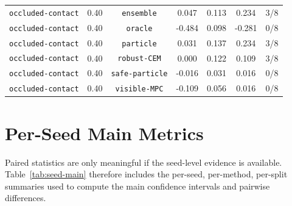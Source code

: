 \documentclass{article}
\begin{document}
\begin{center}
\begin{tabular}{llccccc}
\texttt{occluded-contact} & 0.40 & \texttt{ensemble} & 0.047 & 0.113 & 0.234 & 3/8 \\
\texttt{occluded-contact} & 0.40 & \texttt{oracle} & -0.484 & 0.098 & -0.281 & 0/8 \\
\texttt{occluded-contact} & 0.40 & \texttt{particle} & 0.031 & 0.137 & 0.234 & 3/8 \\
\texttt{occluded-contact} & 0.40 & \texttt{robust-CEM} & 0.000 & 0.122 & 0.109 & 3/8 \\
\texttt{occluded-contact} & 0.40 & \texttt{safe-particle} & -0.016 & 0.031 & 0.016 & 0/8 \\
\texttt{occluded-contact} & 0.40 & \texttt{visible-MPC} & -0.109 & 0.056 & 0.016 & 0/8 \\
\bottomrule
\end{tabular}
\end{center}
\normalsize

\section{Per-Seed Main Metrics}
Paired statistics are only meaningful if the seed-level evidence is available. Table~\ref{tab:seed-main} therefore includes the per-seed, per-method, per-split summaries used to compute the main confidence intervals and pairwise differences.
\end{document}
